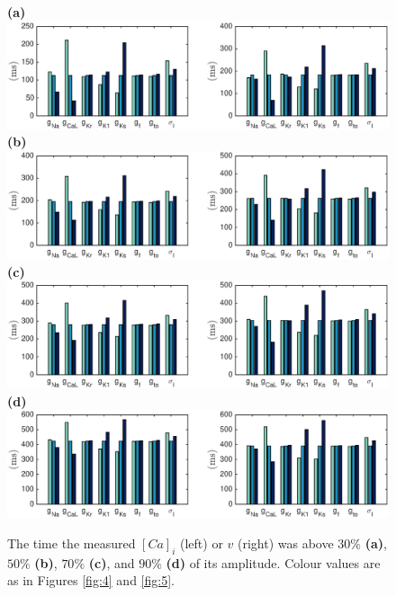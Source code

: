 \documentclass[12pt,a4paper]{article}
\begin{document}
\begin{figure}
 \textbf{(a)}  \includegraphics[trim=1cm 0cm 2cm 0cm, clip=true, width=1\linewidth]{30p} 
 \textbf{(b)}  \includegraphics[trim=1cm 0cm 2cm 0cm, clip=true, width=1\linewidth]{50p} 
 \textbf{(c)}   \includegraphics[trim=1cm 0cm 2cm 0cm, clip=true, width=1\linewidth]{70p} 
  \textbf{(d)}   \includegraphics[trim=1cm 0cm 2cm 0cm, clip=true, width=1\linewidth]{90p} 
    \caption{The time the measured $[Ca]_i$ (left) or $v$ (right) was above $30\%$ \textbf{(a)}, $50\%$ \textbf{(b)}, $70\%$ \textbf{(c)}, and $90\%$ \textbf{(d)} of its amplitude. Colour values are as in Figures \ref{fig:4} and \ref{fig:5}.}
    \label{fig:7}
\end{figure}
\end{document}
